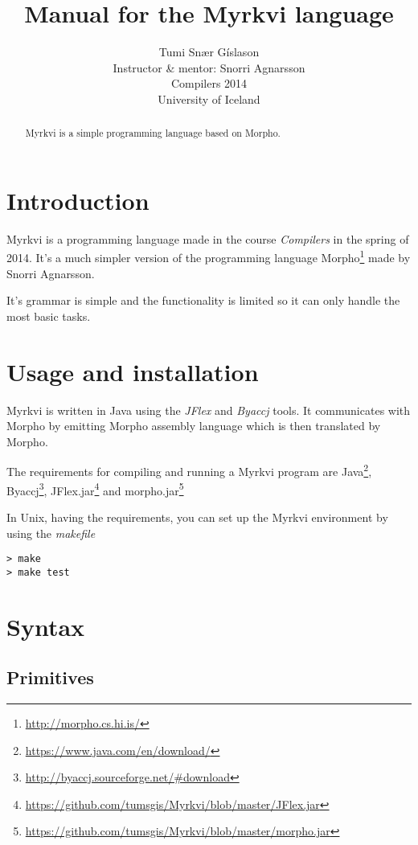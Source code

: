 \documentclass[12pt]{article}
\title{Manual for the Myrkvi language}
\author{Tumi Snær Gíslason \\ Instructor \& mentor: Snorri Agnarsson\\\newline Compilers 2014\\University of Iceland}
\begin{document}
\maketitle


\begin{abstract}
Myrkvi is a simple programming language based on Morpho.
\end{abstract}

\tableofcontents

\section{Introduction}
Myrkvi is a programming language made in the course \emph{Compilers} in the spring of 2014. It's a much simpler version of the programming language Morpho\footnote{\url{http://morpho.cs.hi.is/}}  made by Snorri Agnarsson.

It's grammar is simple and the functionality is limited so it can only handle the most basic tasks.


\section{Usage and installation}

Myrkvi is written in Java using the \emph{JFlex} and \emph{Byaccj} tools.
It communicates with Morpho by emitting Morpho assembly language which is then translated by Morpho.

The requirements for compiling and running a Myrkvi program are Java\footnote{\url{https://www.java.com/en/download/}},
Byaccj\footnote{\url{http://byaccj.sourceforge.net/\#download}},
JFlex.jar\footnote{\url{https://github.com/tumsgis/Myrkvi/blob/master/JFlex.jar}} and
morpho.jar\footnote{\url{https://github.com/tumsgis/Myrkvi/blob/master/morpho.jar}}

In Unix, having the requirements, you can set up the Myrkvi environment by using the \emph{makefile}

\begin{framed}
\begin{verbatim}
> make
> make test
\end{verbatim}
\end{framed}



\section{Syntax}
\subsection{Primitives}
\end{document}
